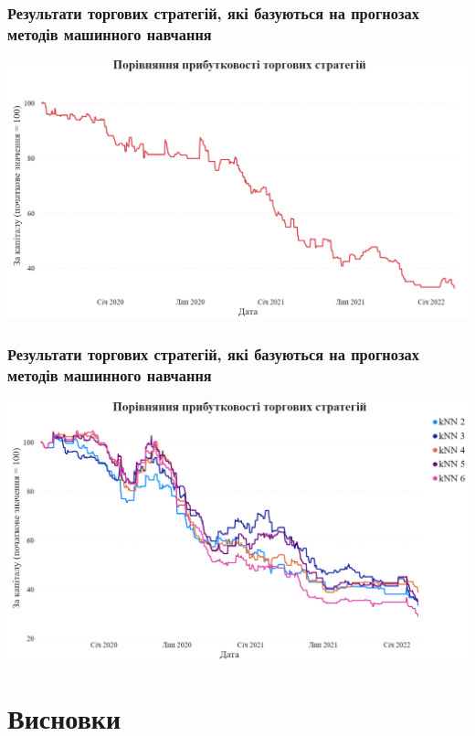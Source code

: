 \documentclass[aspectratio=169]{beamer}
\begin{document}
\begin{frame}
\frametitle{Результати торгових стратегій, які базуються на прогнозах методів машинного навчання}
\begin{center}
\includegraphics[scale=0.33]{Results Part 4.png}
\end{center}
\end{frame}

\begin{frame}
\frametitle{Результати торгових стратегій, які базуються на прогнозах методів машинного навчання}
\begin{center}
\includegraphics[scale=0.33]{Results Part 5.png}
\end{center}
\end{frame}

\section{Висновки}
\end{document}
